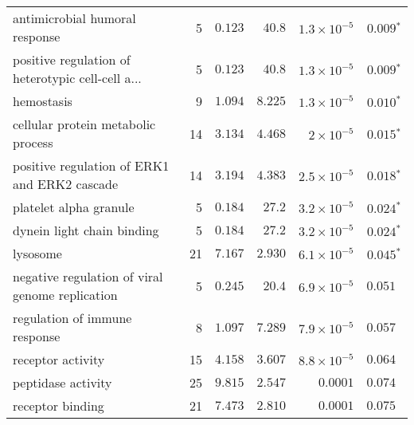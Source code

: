 \begin{longtable}{|l|r|r|r|r|r|}
    antimicrobial humoral response                    & 5                       & $ 0.123$                & $  40.8$     & $1.3\times 10^{-5}$  & $\bm{ 0.009{^*}}$             \\
    positive regulation of heterotypic cell-cell a... & 5                       & $ 0.123$                & $  40.8$     & $1.3\times 10^{-5}$ & $\bm{ 0.009{^*}}$ \\
    hemostasis                                        & 9                       & $ 1.094$                & $ 8.225$   & $1.3\times 10^{-5}$  & $\bm{ 0.010{^*}}$             \\
    cellular protein metabolic process                & 14                      & $ 3.134$                & $ 4.468$   & $ 2\times 10^{-5}$   & $\bm{ 0.015{^*}}$             \\
    positive regulation of ERK1 and ERK2 cascade      & 14                      & $ 3.194$                & $ 4.383$   & $2.5\times 10^{-5}$ & $\bm{ 0.018{^*}}$ \\
    platelet alpha granule                            & 5                       & $ 0.184$                & $  27.2$     & $3.2\times 10^{-5}$  & $\bm{ 0.024{^*}}$             \\
    dynein light chain binding                        & 5                       & $ 0.184$                & $  27.2$     & $3.2\times 10^{-5}$  & $\bm{ 0.024{^*}}$             \\
    lysosome                                          & 21                      & $ 7.167$                & $ 2.930$   & $6.1\times 10^{-5}$  & $\bm{ 0.045{^*}}$             \\
    negative regulation of viral genome replication   & 5                       & $ 0.245$                & $  20.4$     & $6.9\times 10^{-5}$ & $ 0.051~~$ \\
    regulation of immune response                     & 8                       & $ 1.097$                & $ 7.289$   & $7.9\times 10^{-5}$  & $ 0.057~~$                    \\
    receptor activity                                 & 15                      & $ 4.158$                & $ 3.607$   & $8.8\times 10^{-5}$  & $ 0.064~~$                    \\
    peptidase activity                                & 25                      & $ 9.815$                & $ 2.547$   & $0.0001$             & $ 0.074~~$                    \\
    receptor binding                                  & 21                      & $ 7.473$                & $ 2.810$   & $0.0001$             & $ 0.075~~$                    \\

\end{longtable}
